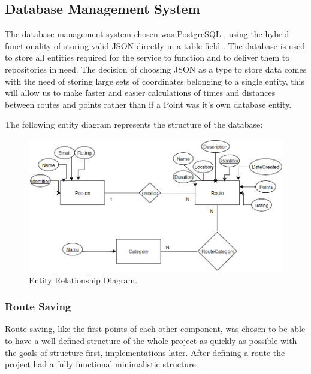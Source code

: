 \documentclass{article}
\begin{document}
            \newpage

        \subsection{Database Management System}
            The database management system chosen was PostgreSQL \cite{postgresql}, using the hybrid functionality of storing valid JSON directly in a table field \cite{postgresqljson}. The database is used to store
            all entities required for the service to function and to deliver them to repositories in need. 
            The decision of choosing JSON as a type to store data comes with the need of storing large sets of coordinates belonging to a single entity, this will allow us to 
            make faster and easier calculations of times and distances between routes and points rather than if a Point was it's own database entity. 

            The following entity diagram represents the structure of the database:
            \begin{figure}[h]            
                \includegraphics[width=\textwidth]{images/project-structure/dbms-structure.PNG}
                \caption{Entity Relationship Diagram.}
            \end{figure}   

            \subsubsection*{Route Saving}
            Route saving, like the first points of each other component, was chosen to be able to have a well defined structure of the whole project as quickly as 
            possible with the goals of structure first, implementations later. After defining a route the project had a fully functional minimalistic structure.
\end{document}
